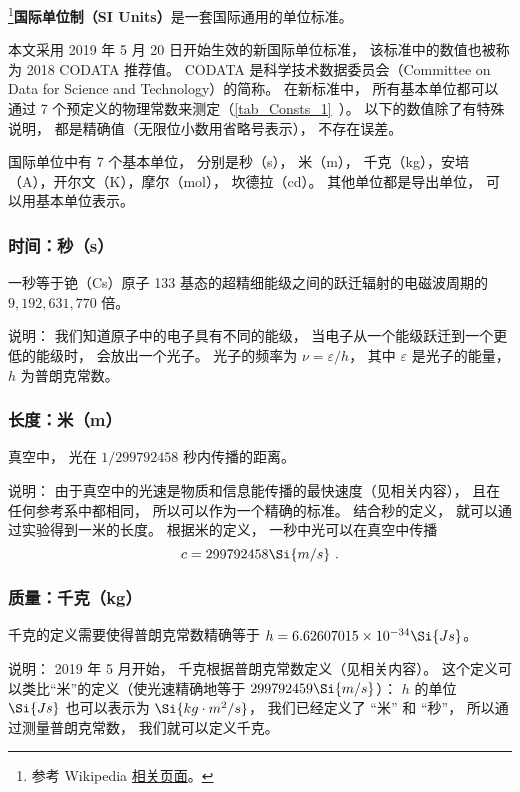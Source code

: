 

\footnote{参考 Wikipedia \href{https://en.wikipedia.org/wiki/International_System_of_Units}{相关页面}。}\textbf{国际单位制（SI Units）}是一套国际通用的单位标准。

本文采用 2019 年 5 月 20 日开始生效的新国际单位标准， 该标准中的数值也被称为 2018 CODATA 推荐值。 CODATA 是科学技术数据委员会（Committee on Data for Science and Technology）的简称。 在新标准中， 所有基本单位都可以通过 7 个预定义的物理常数来测定（\autoref{tab_Consts_1}~）。 以下的数值除了有特殊说明， 都是精确值（无限位小数用省略号表示）， 不存在误差。

国际单位中有 7 个基本单位， 分别是秒（s）， 米（m）， 千克（kg），安培（A），开尔文（K），摩尔（mol）， 坎德拉（cd）。 其他单位都是导出单位， 可以用基本单位表示。

\subsubsection{时间：秒（s）}
一秒等于铯（Cs）原子 133 基态的超精细能级之间的跃迁辐射的电磁波周期的 $9,192,631,770$ 倍。 

说明： 我们知道原子中的电子具有不同的能级， 当电子从一个能级跃迁到一个更低的能级时， 会放出一个光子。 光子的频率为 $\nu  = \varepsilon /h$，   其中 $\varepsilon $ 是光子的能量， $h$ 为普朗克常数。

\subsubsection{长度：米（m）}
真空中， 光在 $1/299792458$ 秒内传播的距离。

说明： 由于真空中的光速是物质和信息能传播的最快速度（见相关内容）， 且在任何参考系中都相同， 所以可以作为一个精确的标准。 结合秒的定义， 就可以通过实验得到一米的长度。 根据米的定义， 一秒中光可以在真空中传播
\begin{equation}
c = 299792458 \Si{m/s}~.
\end{equation}

\subsubsection{质量：千克（kg）}
千克的定义需要使得普朗克常数精确等于 $h = 6.62607015\times10^{-34}\Si{Js}$。

说明： 2019 年 5 月开始， 千克根据普朗克常数定义（见相关内容）。 这个定义可以类比“米”的定义（使光速精确地等于 $299792459\Si{m/s}$）： $h$ 的单位 $\Si{Js}$ 也可以表示为 $\Si{kg\cdot m^2/s}$， 我们已经定义了 “米” 和 “秒”， 所以通过测量普朗克常数， 我们就可以定义千克。

